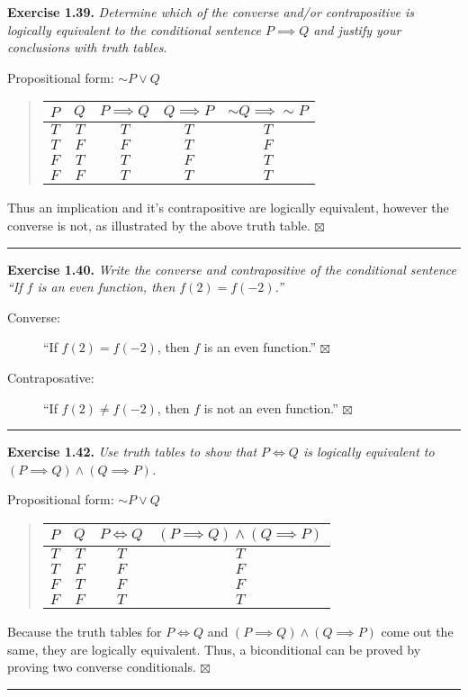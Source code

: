 \documentclass[a4paper,12pt]{article}
\newcommand{\entry}[3]
{
   \noindent\textbf{#1.}
   \emph{#2}
   \bigskip

   \noindent#3
   \bigskip
   \hrule
   \vspace{24pt}
}
\newcommand{\sig}{$\boxtimes$}
\begin{document}
\entry{Exercise 1.39}
{Determine which of the converse and/or contrapositive is logically 
equivalent to the conditional sentence $P \implies Q$ and justify your conclusions with truth tables.}
{
Propositional form: $\sim P \lor Q$
\begin{quote}
\begin{tabular}{|c|c|c|c|c|}
\hline
$P$ & $Q$ & $P \implies Q$ & $Q \implies P$ & $\sim Q \implies \sim P$ \\
\hline
$T$ & $T$ & $T$ & $T$ & $T$ \\
\hline
$T$ & $F$ & $F$ & $T$ & $F$ \\
\hline
$F$ & $T$ & $T$ & $F$ & $T$ \\
\hline
$F$ & $F$ & $T$ & $T$ & $T$ \\
\hline
\end{tabular}
\end{quote}
Thus an implication and it's contrapositive are logically equivalent, however the converse is not, as illustrated by the above truth table. \sig
}



\entry{Exercise 1.40}
{Write the converse and contrapositive of the conditional sentence ``If $f$ is an even function, then $f(2) = f(-2)$.''}
{
\begin{description}
\item[Converse:]
``If $f(2) = f(-2)$, then $f$ is an even function.'' \sig
\item[Contraposative:]
``If $f(2) \ne f(-2)$, then $f$ is not an even function.'' \sig
\end{description}
}



\entry{Exercise 1.42}
{Use truth tables to show that $P \iff Q$ is logically equivalent to $(P \implies Q) \land (Q \implies P)$.}
{
Propositional form: $\sim P \lor Q$
\begin{quote}
\begin{tabular}{|c|c|c|c|}
\hline
$P$ & $Q$ & $P \iff Q$ & $(P \implies Q) \land (Q \implies P)$ \\
\hline
$T$ & $T$ & $T$ & $T$ \\
\hline
$T$ & $F$ & $F$ & $F$ \\
\hline
$F$ & $T$ & $F$ & $F$ \\
\hline
$F$ & $F$ & $T$ & $T$ \\
\hline
\end{tabular}
\end{quote}
Because the truth tables for  $P \iff Q$ and $(P \implies Q) \land (Q \implies P)$ come out the same, they are logically equivalent. Thus, a biconditional can be proved by proving two converse conditionals. \sig
}
\end{document}
